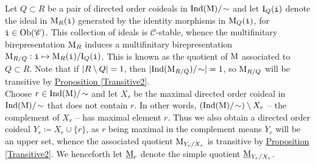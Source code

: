 \noindent Let $Q \subset R$ be a pair of directed order coideals in $\textup{Ind}(\textup{M})/\!\sim$ and let $\textup{I}_Q(\textup{\texttt{i}})$ denote the ideal in $\textup{M}_R(\textup{\texttt{i}})$ generated by the identity morphisms in $\textup{M}_Q(\textup{\texttt{i}})$, for $\textup{\texttt{i}} \in \textup{Ob}(\mathscr{C})$. This collection of ideals is $\mathscr{C}$-stable, whence the multifinitary birepresentation $\textup{M}_R$ induces a multifinitary birepresentation $\textup{M}_{R/Q} : \textup{\texttt{i}} \mapsto \textup{M}_R(\textup{\texttt{i}})/\textup{I}_Q(\textup{\texttt{i}})$. This is known as the quotient of $\textup{M}$ associated to $Q \subset R$. Note that if $\lvert R \setminus Q\rvert = 1$, then $\lvert\textup{Ind}(\textup{M}_{R/Q})/\!\sim\rvert = 1$, so $\textup{M}_{R/Q}$ will be transitive by \hyperref[Transitive2]{Proposition \ref*{Transitive2}}.\\

\noindent Choose $r \in \textup{Ind}(\textup{M})/\!\sim$ and let $X_r$ be the maximal directed order coideal in $\textup{Ind}(\textup{M})/\!\sim$ that does not contain $r$. In other words, $(\textup{Ind}(\textup{M})/\!\sim)\setminus X_r$ -- the complement of $X_r$ -- has maximal element $r$. %
Thus we also obtain a directed order coideal $Y_r \coloneqq X_r \cup \{r\}$, as $r$ being maximal in the complement means $Y_r$ will be an upper set, whence the associated quotient $\textup{M}_{Y_r/X_r}$ is transitive by \hyperref[Transitive2]{Proposition \ref*{Transitive2}}. We henceforth let $\underline{\textup{M}}_r$ denote the simple quotient $\underline{\textup{M}}_{Y_r/X_r}$.\newpage


